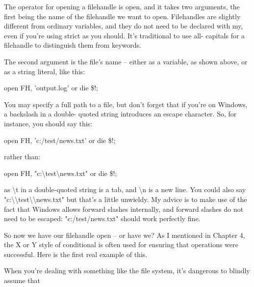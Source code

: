 \documentclass[a4paper,11pt]{book}
\begin{document}
\noindent 

\noindent The operator for opening a filehandle is open, and it takes two arguments, the first being the name of the filehandle we want to open. Filehandles are slightly different from ordinary variables, and they do not need to be declared with my, even if you're using strict as you should. It's traditional to use all- capitals for a filehandle to distinguish them from keywords.

\noindent 

\noindent The second argument is the file's name -- either as a variable, as shown above, or as a string literal, like this:

\noindent 

\noindent 

\noindent open FH, 'output.log' or die \$!;

\noindent 

\noindent You may specify a full path to a file, but don't forget that if you're on Windows, a backslash in a double- quoted string introduces an escape character. So, for instance, you should say this:

\noindent 

\noindent open FH, 'c:/test/news.txt' or die \$!;

\noindent 

\noindent rather than:

\noindent 

\noindent open FH, "c:\textbackslash test\textbackslash news.txt" or die \$!;

\noindent 

\noindent as \textbackslash t in a double-quoted string is a tab, and \textbackslash n is a new line. You could also say "c:\textbackslash \textbackslash test\textbackslash \textbackslash news.txt" but that's a little unwieldy. My advice is to make use of the fact that Windows allows forward slashes internally, and forward slashes do not need to be escaped: "c:/test/news.txt" should work perfectly fine.

\noindent 

\noindent So now we have our filehandle open -- or have we? As I mentioned in Chapter 4, the X or Y style of conditional is often used for ensuring that operations were successful. Here is the first real example of this.

\noindent 

\noindent When you're dealing with something like the file system, it's dangerous to blindly assume that
\end{document}
